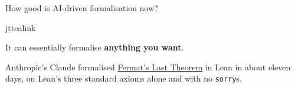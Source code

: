 \documentclass[aspectratio=169,10pt]{beamer}
\begin{document}
\begin{frame}{How good is AI-driven formalisation now?}
  \vfill
  \begin{jtquote}[left=20pt,right=20pt,top=13pt,bottom=13pt]{jttealink}
    {\fontsize{17}{24}\selectfont\color{jtslate}%
      It can essentially formalise {\bfseries anything you want}.\par}
    \vspace{8pt}
    {\fontsize{11}{15}\selectfont\color{jtgrey}%
      Anthropic's Claude formalised
      \href{https://github.com/anthropics/fermats-last-theorem}{%
        \color{jtgrey}Fermat's Last Theorem}
      in Lean in about eleven days, on Lean's three standard axioms alone
      and with no \texttt{sorry}s.\par}
  \end{jtquote}

  \vspace{8pt}
  \vfill
\end{frame}
\end{document}
